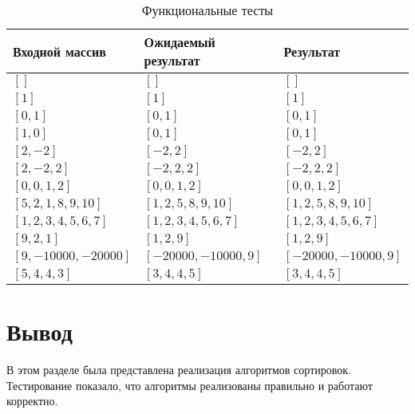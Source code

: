 \begin{table}[h]
	\begin{center}
	\begin{threeparttable}
	\captionsetup{justification=raggedright,singlelinecheck=off}
	\caption{\label{tbl:functional_test} Функциональные тесты}
		\begin{tabular}{|l|l|l|}
			\hline
			Входной массив & Ожидаемый результат & Результат \\ 
			\hline
			$[]$  & $[]$  & $[]$\\
			$[1]$  & $[1]$  & $[1]$\\
			$[0, 1]$  & $[0, 1]$  & $[0, 1]$\\
			$[1, 0]$  & $[0, 1]$  & $[0, 1]$\\
			$[2, -2]$  & $[-2, 2]$  & $[-2, 2]$\\
			$[2, -2, 2]$  & $[-2, 2, 2]$  & $[-2, 2, 2]$\\
			$[0, 0, 1, 2]$  & $[0, 0, 1, 2]$  & $[0, 0, 1, 2]$\\
			$[5, 2, 1, 8, 9, 10]$  & $[1, 2, 5, 8, 9, 10]$  & $[1, 2, 5, 8, 9, 10]$\\
			$[1, 2, 3, 4, 5, 6, 7]$  & $[1, 2, 3, 4, 5, 6, 7]$  & $[1, 2, 3, 4, 5, 6, 7]$\\
			$[9, 2, 1]$  & $[1, 2, 9]$  & $[1, 2, 9]$\\
			$[9, -10000, -20000]$  & $[-20000, -10000, 9]$  & $[-20000, -10000, 9]$\\
			$[5, 4, 4, 3]$  & $[3, 4, 4, 5]$  & $[3, 4, 4, 5]$\\
			\hline
		\end{tabular}
	\end{threeparttable}
	\end{center}
\end{table}

\section*{Вывод}

В этом разделе была представлена реализация алгоритмов сортировок. Тестирование показало, что алгоритмы реализованы правильно и работают корректно.
